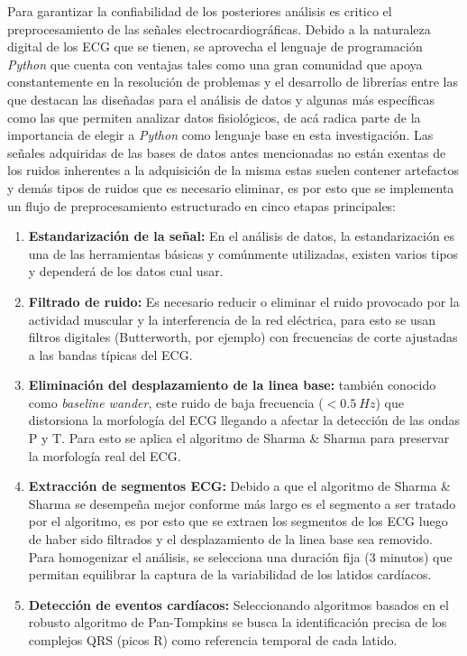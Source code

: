 \documentclass[12pt,letterpaper,oneside,openright]{book}
\begin{document}
Para garantizar la confiabilidad de los posteriores análisis es critico el preprocesamiento de las señales electrocardiográficas. Debido a la naturaleza digital de los ECG que se tienen, se aprovecha el lenguaje de programación \emph{Python} que cuenta con ventajas tales como una gran comunidad que apoya constantemente en la resolución de problemas y el desarrollo de librerías entre las que destacan las diseñadas para el análisis de datos y algunas más específicas como las que permiten analizar datos fisiológicos, de acá radica parte de la importancia de elegir a \emph{Python} como lenguaje base en esta investigación. Las señales adquiridas de las bases de datos antes mencionadas no están exentas de los ruidos inherentes a la adquisición de la misma estas suelen contener artefactos y demás tipos de ruidos que es necesario eliminar, es por esto que se implementa un flujo de preprocesamiento estructurado en cinco etapas principales:
\begin{enumerate}
	\item \textbf{Estandarización de la señal:} En el análisis de datos, la estandarización es una de las herramientas básicas y comúnmente utilizadas, existen varios tipos y dependerá de los datos cual usar.
	\item \textbf{Filtrado de ruido:} Es necesario reducir o eliminar el ruido provocado por la actividad muscular y la interferencia de la red eléctrica, para esto se usan filtros digitales (Butterworth, por ejemplo) con frecuencias de corte ajustadas a las bandas típicas del ECG.
	\item \textbf{Eliminación del desplazamiento de la linea base:} también conocido como \emph{baseline wander}, este ruido de baja frecuencia ($<0.5\ Hz$) que distorsiona la morfología del ECG llegando a afectar la detección de las ondas P y T. Para esto se aplica el algoritmo de Sharma \& Sharma \cite{Sharma15} para preservar la morfología real del ECG.
	\item \textbf{Extracción de segmentos ECG:} Debido a que el algoritmo de Sharma \& Sharma \cite{Sharma15} se desempeña mejor conforme más largo es el segmento a ser tratado por el algoritmo, es por esto que se extraen los segmentos de los ECG luego de haber sido filtrados y el desplazamiento de la linea base sea removido. Para homogenizar el análisis, se selecciona una duración fija (3 minutos) que permitan equilibrar la captura de la variabilidad de los latidos cardíacos. 
	\item \textbf{Detección de eventos cardíacos:} Seleccionando algoritmos basados en el robusto algoritmo de Pan-Tompkins \cite{PanTompkins85} se busca la identificación precisa de los complejos QRS (picos R) como referencia temporal de cada latido.
\end{enumerate}
\end{document}

